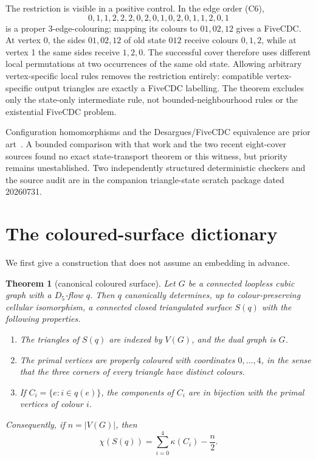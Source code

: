 \documentclass[11pt]{article}
\newtheorem{theorem}{Theorem}
\theoremstyle{definition}
\theoremstyle{remark}
\newcommand{\kap}{\kappa}
\begin{document}
The restriction is visible in a positive control.  In the edge order
(C6),
\[
0,1,1,2,2,2,0,2,0,1,0,2,0,1,1,2,0,1
\]
is a proper 3-edge-colouring; mapping its colours to \(01,02,12\) gives a
FiveCDC.  At vertex 0, the sides \(01,02,12\) of old state \(012\) receive
colours \(0,1,2\), while at vertex 1 the same sides receive \(1,2,0\).
The successful cover therefore uses different local permutations at two
occurrences of the same old state.  Allowing arbitrary vertex-specific
local rules removes the restriction entirely: compatible vertex-specific
output triangles are exactly a FiveCDC labelling.  The theorem excludes
only the state-only intermediate rule, not bounded-neighbourhood rules or
the existential FiveCDC problem.

Configuration homomorphisms and the Desargues/FiveCDC equivalence are
prior art~\cite{KralEtAl2009}.  A bounded comparison with that work and
the two recent eight-cover sources found no exact state-transport theorem
or this witness, but priority remains unestablished.  Two independently
structured deterministic checkers and the source audit are in the companion
triangle-state scratch package dated 20260731.

\section{The coloured-surface dictionary}

We first give a construction that does not assume an embedding in
advance.

\begin{theorem}[canonical coloured surface]\label{thm:surface}
Let \(G\) be a connected loopless cubic graph with a \(D_5\)-flow \(q\).
Then \(q\) canonically determines, up to colour-preserving cellular
isomorphism, a connected closed triangulated surface \(S(q)\) with the
following properties.
\begin{enumerate}
 \item The triangles of \(S(q)\) are indexed by \(V(G)\), and the dual
 graph is \(G\).
 \item The primal vertices are properly coloured with coordinates
 \(0,\ldots,4\), in the sense that the three corners of every triangle
 have distinct colours.
 \item If \(C_i=\{e:i\in q(e)\}\), the components of \(C_i\) are in
 bijection with the primal vertices of colour \(i\).
\end{enumerate}
Consequently, if \(n=|V(G)|\), then
\[
 \chi(S(q))=\sum_{i=0}^4\kap(C_i)-\frac n2.                  \tag{2}
\]
\end{theorem}
\end{document}
